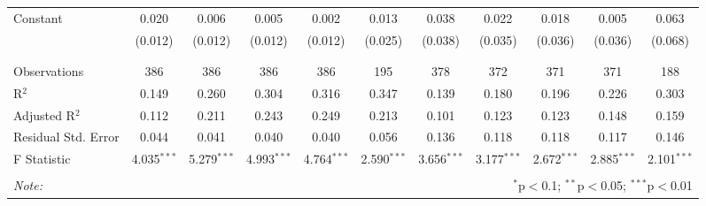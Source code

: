 \begin{table}[H]
\begin{tabular}{@{\extracolsep{4pt}}lcccccccccc}
 Constant & 0.020 & 0.006 & 0.005 & 0.002 & 0.013 & 0.038 & 0.022 & 0.018 & 0.005 & 0.063 \\ 
  & (0.012) & (0.012) & (0.012) & (0.012) & (0.025) & (0.038) & (0.035) & (0.036) & (0.036) & (0.068) \\ 
  & & & & & & & & & & \\ 
\hline \\[-1.8ex] 
Observations & 386 & 386 & 386 & 386 & 195 & 378 & 372 & 371 & 371 & 188 \\ 
R$^{2}$ & 0.149 & 0.260 & 0.304 & 0.316 & 0.347 & 0.139 & 0.180 & 0.196 & 0.226 & 0.303 \\ 
Adjusted R$^{2}$ & 0.112 & 0.211 & 0.243 & 0.249 & 0.213 & 0.101 & 0.123 & 0.123 & 0.148 & 0.159 \\ 
Residual Std. Error & 0.044 & 0.041 & 0.040 & 0.040 & 0.056 & 0.136 & 0.118 & 0.118 & 0.117 & 0.146 \\ 
F Statistic & 4.035$^{***}$ & 5.279$^{***}$ & 4.993$^{***}$ & 4.764$^{***}$ & 2.590$^{***}$ & 3.656$^{***}$ & 3.177$^{***}$ & 2.672$^{***}$ & 2.885$^{***}$ & 2.101$^{***}$ \\ 
\hline 
\hline \\[-1.8ex] 
\textit{Note:}  & \multicolumn{10}{r}{$^{*}$p$<$0.1; $^{**}$p$<$0.05; $^{***}$p$<$0.01} \\ 
\end{tabular} 
\end{table} 
